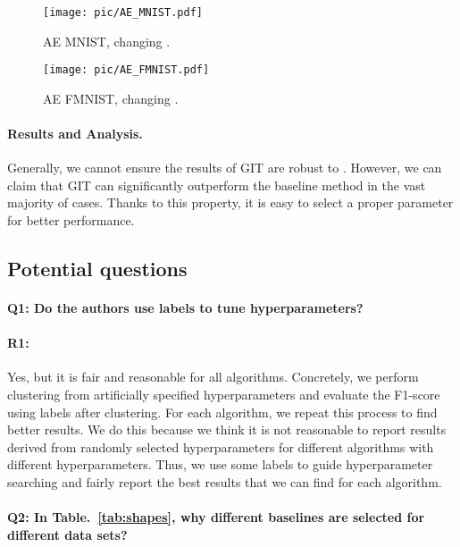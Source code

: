 \documentclass[letterpaper]{article} \usepackage{aaai22}  \usepackage{times}  \usepackage{helvet}  \usepackage{courier}  \usepackage[hyphens]{url}  \usepackage{graphicx} \urlstyle{rm} \def\UrlFont{\rm}  \usepackage{natbib}  \usepackage{caption} \DeclareCaptionStyle{ruled}{labelfont=normalfont,labelsep=colon,strut=off} \frenchspacing  \setlength{\pdfpagewidth}{8.5in}  \setlength{\pdfpageheight}{11in}  \usepackage{subfigure}
\begin{document}
\begin{figure}[h]
    \centering
    \texttt{[image: pic/AE\_MNIST.pdf]}
    \caption{ AE MNIST, changing . }
    \label{fig:AE_MNIST}
\end{figure}

\begin{figure}[h]
    \centering
    \texttt{[image: pic/AE\_FMNIST.pdf]}
    \caption{ AE FMNIST, changing . }
    \label{fig:AE_FMNIST}
\end{figure}





\paragraph{Results and Analysis.} Generally, we cannot ensure the results of GIT are robust to . However, we can claim that GIT can significantly outperform the baseline method in the vast majority of cases. Thanks to this property, it is easy to select a proper parameter for better performance.

\clearpage
\subsection{Potential questions}
\paragraph{Q1: Do the authors use labels to tune hyperparameters?}

\paragraph{R1:} Yes, but it is fair and reasonable for all algorithms. Concretely, we perform clustering from artificially specified hyperparameters and evaluate the F1-score using labels after clustering. For each algorithm, we repeat this process to find better results. We do this because we think it is not reasonable to report results derived from randomly selected hyperparameters for different algorithms with different hyperparameters. Thus, we use some labels to guide hyperparameter searching and fairly report the best results that we can find for each algorithm.



\paragraph{Q2: In Table.~\ref{tab:shapes}, why different baselines are selected for different data sets? }
\end{document}
